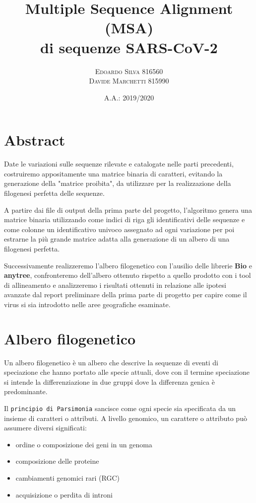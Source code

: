 \documentclass[11pt,italian]{article}
\title{Multiple Sequence Alignment (MSA) \\ di sequenze SARS-CoV-2}
\date{A.A.: 2019/2020}
\author{
    \textsc{Edoardo Silva} 816560 \\
    \textsc{Davide Marchetti} 815990
}
\begin{document}
\maketitle

\section{Abstract}
Date le variazioni sulle sequenze rilevate e catalogate nelle parti precedenti, costruiremo appositamente una matrice binaria di caratteri, evitando la generazione della "matrice proibita", da utilizzare per la realizzazione della filogenesi perfetta delle sequenze.

A partire dai file di output della prima parte del progetto, l'algoritmo genera una matrice binaria utilizzando come indici di riga gli identificativi delle sequenze e come colonne un identificativo univoco assegnato ad ogni variazione per poi estrarne la più grande matrice adatta alla generazione di un albero di una filogenesi perfetta.

Successivamente realizzeremo l'albero filogenetico con l'ausilio delle librerie \textbf{Bio} e \textbf{anytree}, confronteremo dell'albero ottenuto rispetto a quello prodotto con i tool di allineamento e analizzeremo i risultati ottenuti in relazione alle ipotesi avanzate dal report preliminare della prima parte di progetto per capire come il virus si sia introdotto nelle aree geografiche esaminate.

\newpage

\section{Albero filogenetico}
Un albero filogenetico è un albero che descrive la sequenze di eventi di speciazione che hanno portato alle specie attuali, dove con il termine speciazione si intende la differenziazione in due gruppi dove la differenza genica è predominante.

Il \lstinline{principio di Parsimonia} sancisce come ogni specie sia specificata da un insieme di caratteri o attributi.
A livello genomico, un carattere o attributo può assumere diversi significati:
\begin{itemize}
  \item ordine o composizione dei geni in un genoma
  \item composizione delle proteine
  \item cambiamenti genomici rari (RGC)
  \item acquisizione o perdita di introni
\end{itemize}
\end{document}

